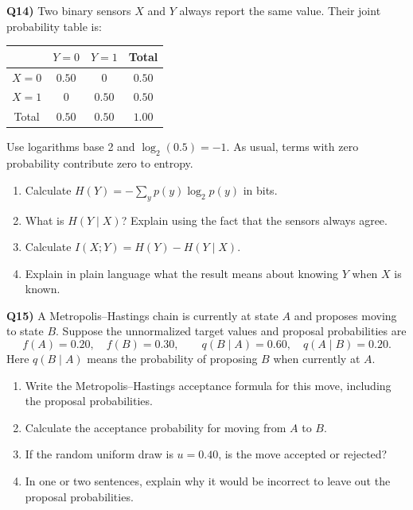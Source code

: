 \documentclass[12pt]{article}
\newcommand{\question}[2]{\vspace{0.7em}\noindent\textbf{Q#1)}}
\begin{document}
\question{14}{}
Two binary sensors $X$ and $Y$ always report the same value. Their joint probability table is:
\begin{center}
\begin{tabular}{c|cc|c}
 & $Y=0$ & $Y=1$ & Total\\
\hline
$X=0$ & $0.50$ & $0$ & $0.50$\\
$X=1$ & $0$ & $0.50$ & $0.50$\\
\hline
Total & $0.50$ & $0.50$ & $1.00$
\end{tabular}
\end{center}
Use logarithms base 2 and $\log_2(0.5)=-1$. As usual, terms with zero probability contribute zero to entropy.
\begin{enumerate}[label=(\alph*)]
\item Calculate $H(Y)=-\sum_y p(y)\log_2p(y)$ in bits.
\item What is $H(Y\mid X)$? Explain using the fact that the sensors always agree.
\item Calculate $I(X;Y)=H(Y)-H(Y\mid X)$.
\item Explain in plain language what the result means about knowing $Y$ when $X$ is known.
\end{enumerate}

\question{15}{}
A Metropolis--Hastings chain is currently at state $A$ and proposes moving to state $B$. Suppose the unnormalized target values and proposal probabilities are
\[
f(A)=0.20,\quad f(B)=0.30,\qquad q(B\mid A)=0.60,\quad q(A\mid B)=0.20.
\]
Here $q(B\mid A)$ means the probability of proposing $B$ when currently at $A$.
\begin{enumerate}[label=(\alph*)]
\item Write the Metropolis--Hastings acceptance formula for this move, including the proposal probabilities.
\item Calculate the acceptance probability for moving from $A$ to $B$.
\item If the random uniform draw is $u=0.40$, is the move accepted or rejected?
\item In one or two sentences, explain why it would be incorrect to leave out the proposal probabilities.
\end{enumerate}
\end{document}
